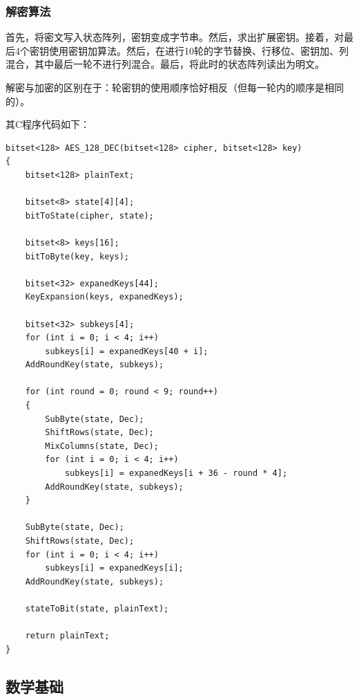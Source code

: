 \subsubsection{解密算法}
首先，将密文写入状态阵列，密钥变成字节串。然后，求出扩展密钥。接着，对最后4个密钥使用密钥加算法。然后，在进行10轮的字节替换、行移位、密钥加、列混合，其中最后一轮不进行列混合。最后，将此时的状态阵列读出为明文。\par
解密与加密的区别在于：轮密钥的使用顺序恰好相反（但每一轮内的顺序是相同的）。\par
其C程序代码如下：
\begin{prove}
\begin{verbatim}
bitset<128> AES_128_DEC(bitset<128> cipher, bitset<128> key)
{
    bitset<128> plainText;
    
    bitset<8> state[4][4];
    bitToState(cipher, state);
    
    bitset<8> keys[16];
    bitToByte(key, keys);
    
    bitset<32> expanedKeys[44];
    KeyExpansion(keys, expanedKeys);
    
    bitset<32> subkeys[4];
    for (int i = 0; i < 4; i++)
        subkeys[i] = expanedKeys[40 + i];
    AddRoundKey(state, subkeys);
    
    for (int round = 0; round < 9; round++)
    {
        SubByte(state, Dec);
        ShiftRows(state, Dec);
        MixColumns(state, Dec);
        for (int i = 0; i < 4; i++)
            subkeys[i] = expanedKeys[i + 36 - round * 4];
        AddRoundKey(state, subkeys);
    }
    
    SubByte(state, Dec);
    ShiftRows(state, Dec);
    for (int i = 0; i < 4; i++)
        subkeys[i] = expanedKeys[i];
    AddRoundKey(state, subkeys);
    
    stateToBit(state, plainText);

    return plainText;
}
\end{verbatim}
\end{prove}
\subsection{数学基础}
